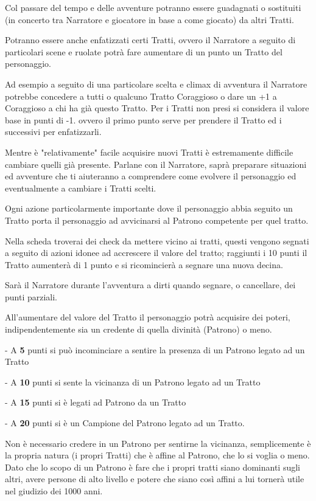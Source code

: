 \documentclass[a4paper,11pt,twoside,openany]{book}
\begin{document}
Col passare del tempo e delle avventure potranno essere guadagnati o sostituiti (in concerto tra Narratore e giocatore in base a come giocato) da altri Tratti.

Potranno essere anche enfatizzati certi Tratti, ovvero il Narratore a seguito di particolari scene e ruolate potrà fare aumentare di un punto un Tratto del personaggio.

Ad esempio a seguito di una particolare scelta e climax di avventura il Narratore potrebbe concedere a tutti o qualcuno Tratto Coraggioso o dare un +1 a Coraggioso a chi ha già questo Tratto. Per i Tratti non presi si considera il valore base in punti di -1. ovvero il primo punto serve per prendere il Tratto ed i successivi per enfatizzarli.

Mentre è "relativamente" facile acquisire nuovi Tratti è estremamente difficile cambiare quelli già presente. Parlane con il Narratore, saprà preparare situazioni ed avventure che ti aiuteranno a comprendere come evolvere il personaggio ed eventualmente a cambiare i Tratti scelti.

Ogni azione particolarmente importante dove il personaggio abbia seguito un Tratto porta il personaggio ad avvicinarsi al Patrono competente per quel tratto.

Nella scheda troverai dei check da mettere vicino ai tratti, questi vengono segnati a seguito di azioni idonee ad accrescere il valore del tratto; raggiunti i 10 punti il Tratto aumenterà di 1 punto e si ricomincierà a segnare una nuova decina.

Sarà il Narratore durante l'avventura a dirti quando segnare, o cancellare, dei punti parziali.

All'aumentare del valore del Tratto il personaggio potrà acquisire dei poteri, indipendentemente sia un credente di quella divinità (Patrono) o meno.

- A \textbf{5} punti si può incominciare a sentire la presenza di un Patrono legato ad un Tratto

- A \textbf{10} punti si sente la vicinanza di un Patrono legato ad un Tratto

- A \textbf{15}  punti si è legati ad Patrono da un Tratto

- A \textbf{20} punti si è un Campione del Patrono legato ad un Tratto.


Non è necessario credere in un Patrono per sentirne la vicinanza, semplicemente è la propria natura (i propri Tratti) che è affine al Patrono, che lo si voglia o meno.
Dato che lo scopo di un Patrono è fare che i propri tratti siano dominanti sugli altri, avere persone di alto livello e potere che siano così affini a lui tornerà utile nel giudizio dei   1000 anni.
\end{document}
